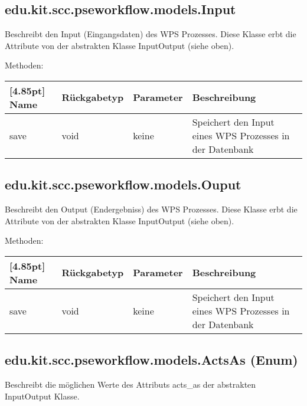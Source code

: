     	\subsection{edu.kit.scc.pseworkflow.models.Input}
			Beschreibt den Input (Eingangsdaten) des WPS Prozesses. \newline
			Diese Klasse erbt die Attribute von der abstrakten Klasse InputOutput (siehe oben).
			
			Methoden:
			\begin{center}
				\setlength\tabcolsep{5pt}
				\renewcommand{\arraystretch}{1.5}
				
				\begin{tabularx}{\textwidth}{|l|l|l|X|}
					\hline
					\rowcolor[gray]{0.75}[4.85pt]
					Name & Rückgabetyp & Parameter & Beschreibung \\ \hline 
					save & void & keine &Speichert den Input eines WPS Prozesses in der Datenbank \\
					\hline
				\end{tabularx}
			\end{center}

        \subsection{edu.kit.scc.pseworkflow.models.Ouput}
			Beschreibt den Output (Endergebniss) des WPS Prozesses. \newline
			Diese Klasse erbt die Attribute von der abstrakten Klasse InputOutput (siehe oben).
			
			Methoden:
			\begin{center}
				\setlength\tabcolsep{5pt}
				\renewcommand{\arraystretch}{1.5}
				
				\begin{tabularx}{\textwidth}{|l|l|l|X|}
					\hline
					\rowcolor[gray]{0.75}[4.85pt]
					Name & Rückgabetyp & Parameter & Beschreibung \\ \hline 
				    save & void & keine & Speichert den Input eines WPS Prozesses in der Datenbank \\
					\hline
				\end{tabularx}
			\end{center}
 
		\subsection{edu.kit.scc.pseworkflow.models.ActsAs (Enum)}	
			Beschreibt die möglichen Werte des Attributs acts\_as der abstrakten InputOutput Klasse. \newline
			
